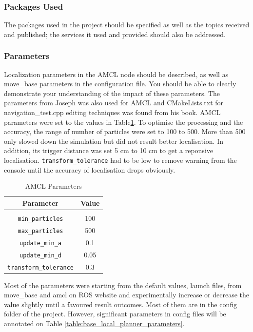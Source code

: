 \documentclass[10pt,journal,compsoc]{IEEEtran}
\begin{document}
\subsubsection{Packages Used}
The packages used in the project should be specified as well as the topics received and published; the services it used and provided should also be addressed. 
\subsubsection{Parameters}
Localization parameters in the AMCL node should be described, as well as move\_base parameters in the configuration file. You should be able to clearly demonstrate your understanding of the impact of these parameters. The parameters from Joseph was also used for AMCL and CMakeLists.txt for navigation\_test.cpp editing techniques was found from his book.\cite{Joseph2015}
AMCL parameters were set to the values in Table\ref{table:AMCL_parameters}. To optimise the processing and the accuracy, the range of number of particles were set to 100 to 500. More than 500 only slowed down the simulation but did not result better localisation. In addition, its trigger distance was set 5 cm to 10 cm to get a reponsive localisation.
\verb!transform_tolerance! had to be low to remove warning from the console until the accuracy of localisation drops obviously.
\begin{table}[ht]
      \caption{AMCL Parameters}
      \label{table:AMCL_parameters}
      \begin{center}
      \begin{tabular}{|c|c|}
      \hline
      Parameter & Value \\
      \hline\hline \\
      \hline
      \verb!min_particles! &100 \\
      \hline
      \verb!max_particles! &500 \\
      \hline
      \verb!update_min_a! &0.1 \\
      \hline
      \verb!update_min_d! &0.05 \\
      \hline
      \verb!transform_tolerance! &0.3 \\
      \hline
      \end{tabular}
      \end{center}
\end{table}
Most of the parameters were starting from the default values, launch files, from move\_base and amcl on ROS website and experimentally increase or decrease the value slightly until a favoured result outcomes. Most of them are in the config folder of the project.\cite{AMCL_ROS} However, significant parameters in config files will be annotated on Table \ref{table:base_local_planner_parameters}.   
\end{document}
